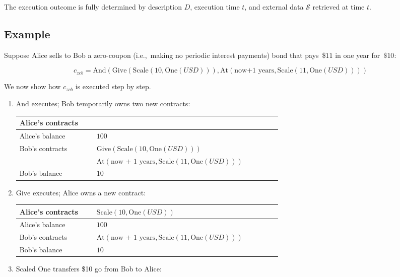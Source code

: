 The execution outcome is fully determined by description $D$, execution time $t$, and external data $\mathcal{S}$ retrieved at time $t$.


\subsection{Example}

Suppose Alice sells to Bob a zero-coupon (i.e.,~making no periodic interest payments) bond that pays~\$$11$ in one year for~\$$10$:

\[c_{zcb} = \mathrm{And}(\mathrm{Give}(\mathrm{Scale}(10,\mathrm{One}(USD))),\mathrm{At}(\text{now+1 years},\mathrm{Scale}(11,\mathrm{One}(USD))))\]

We now show how \(c_{zcb}\) is executed step by step.

\begin{enumerate}
	
	\item \(\mathrm{And}\) executes; Bob temporarily owns two new contracts:
	
	\begin{tabular}{| p{0.25\linewidth} | p{0.60\linewidth} |}
		\hline
		Alice's contracts & \\
		\hline
		Alice's balance & $100$ \\
		\hline
		\multirow{2}{10em}{Bob's contracts} & \(\mathrm{Give}(\mathrm{Scale}(10,\mathrm{One}(USD)))\)\\
		& \(\mathrm{At}(\text{now + 1 years},\mathrm{Scale}(11,\mathrm{One}(USD)))\)\\
		\hline
		Bob's balance & $10$ \\
		\hline    
	\end{tabular}
	
	\item \(\mathrm{Give}\) executes; Alice owns a new contract:
	
	\begin{tabular}{| p{0.25\linewidth} | p{0.60\linewidth} |}
		\hline
		Alice's contracts & \(\mathrm{Scale}(10,\mathrm{One}(USD))\) \\
		\hline
		Alice's balance & $100$ \\
		\hline
		Bob's contracts & \(\mathrm{At}(\text{now + 1 years},\mathrm{Scale}(11,\mathrm{One}(USD)))\) \\
		\hline
		Bob's balance & $10$ \\
		\hline    
	\end{tabular}
	
	\item Scaled \(\mathrm{One}\) transfers \$10 go from Bob to Alice:
	

\end{enumerate}
